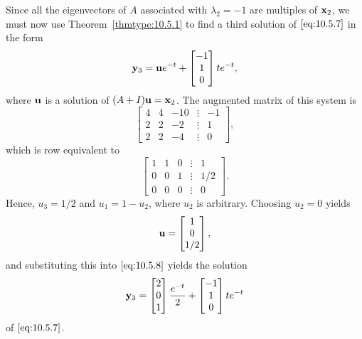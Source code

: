 \documentclass{ximera}
\begin{document}
\begin{example}
\begin{explanation}
Since all the eigenvectors of $A$ associated with $\lambda_2=-1$ are
multiples of ${\bf x}_2$, we must now use Theorem~\ref{thmtype:10.5.1} to
find a third solution of $\eqref{eq:10.5.7}$ in the form
\begin{equation}\label{eq:10.5.8}
{\bf y}_3={\bf u}e^{-t}+\begin{bmatrix}-1\\1\\0\end{bmatrix}te^{-t},
\end{equation}
where ${\bf u}$ is a solution of $(A+I){\bf u=x}_2$.
The  augmented matrix  of this system is
$$
\begin{bmatrix} 4 & 4 & -10 &\vdots & -1\\ 2 & 2 & -2 &
\vdots & 1\\ 2 & 2 & -4 &\vdots & 0\end{bmatrix},
$$
which is  row equivalent to
$$
\begin{bmatrix} 1 & 1 & 0 &\vdots& 1\\ 0 & 0 & 1
&\vdots& 1/2
\\ 0 & 0 & 0 &\vdots&0\end{bmatrix}.
$$
Hence, $u_3=1/2$ and $u_1 =1-u_2$, where $u_2$  is
arbitrary. Choosing $u_2=0$ yields
$$
{\bf u} =\begin{bmatrix}1\\0\\1/2\end{bmatrix},
$$
and substituting this into  $\eqref{eq:10.5.8}$
yields the solution
$$
{\bf y}_3=\begin{bmatrix}2\\0\\1\end{bmatrix}\frac{e^{-t}}{2}+\begin{bmatrix}-1\\1\\0\end{bmatrix}te^{-t}
$$
of  $\eqref{eq:10.5.7}$.


\end{explanation}
\end{example}
\end{document}

